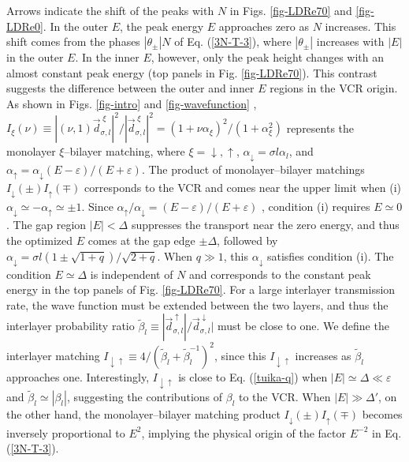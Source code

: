 \documentclass{jpsj3}
\begin{document}
Arrows indicate
the shift of the peaks with $N$
in Figs. \ref{fig-LDRe70}
and \ref{fig-LDRe0}.
In the outer $E$,
the peak energy $E$ approaches
zero as $N$ increases.
This shift comes from the phases $|\theta_\pm|N$ of Eq. (\ref{3N-T-3}),
where $|\theta_\pm|$ increases with $|E|$ in the outer $E$.
In the inner $E$, however, only the peak height changes
with an almost constant peak energy 
(top panels in Fig. \ref{fig-LDRe70}).
This contrast suggests
the difference between the outer and inner $E$ regions
in the VCR origin.
As shown in Figs. \ref{fig-intro} and \ref{fig-wavefunction} ,
$I_\xi(\nu) \equiv |(\nu,1) \vec{d}^{\;\xi}_{\sigma,l}|^2/|\vec{d}^{\;\xi}_{\sigma,l}|^2=(1+\nu\alpha_\xi)^2/(1+\alpha_\xi^2)$
represents the monolayer $\xi$--bilayer matching, where $\xi =\downarrow,\uparrow$, $\alpha_\downarrow =\sigma l \alpha_l$, and $\alpha_\uparrow= \alpha_\downarrow(E-\varepsilon)/(E+\varepsilon)$. 
The product of monolayer--bilayer matchings $I_\downarrow(\pm)I_\uparrow(\mp)$ corresponds to
the VCR and comes near the upper limit when (i) $\alpha_\downarrow \simeq -\alpha_\uparrow \simeq \pm 1$. Since 
$ \alpha_\uparrow/\alpha_\downarrow =(E-\varepsilon)/(E+\varepsilon)$
, condition (i) requires $E\simeq 0$.
The gap region $|E| < \Delta$ suppresses the transport near the zero energy, and thus
the optimized $E$ comes at the gap edge $\pm \Delta$, followed by $\alpha_\downarrow=\sigma l ( 1 \pm \sqrt{1+q})/\sqrt{2+q}$. 
When $q \gg 1$, this $\alpha_\downarrow$ satisfies condition (i). 
The condition $E \simeq \Delta$ is independent of $N$
and corresponds to the constant peak energy in the top panels of Fig. \ref{fig-LDRe70}.
For a large interlayer transmission rate,
the wave function must be extended between the two layers,
and thus the interlayer probability ratio
$\tilde{\beta}_l \equiv
|\vec{d}_{\sigma,l}^{\;\uparrow}|/
\vec{d}_{\sigma,l}^{\;\downarrow}| $
must be close to one.
We define the interlayer matching $I_{\downarrow\uparrow} \equiv 4/(\tilde{\beta}_l+\tilde{\beta}_l^{-1})^2$, 
since this $I_{\downarrow\uparrow}$ increases as $\tilde{\beta}_l$ approaches one.
Interestingly, 
$I_{\downarrow\uparrow}$ is close to Eq. (\ref{tuika-q}) when $|E|\simeq \Delta \ll \varepsilon$ and $\tilde{\beta}_l \simeq |\beta_l|$,
suggesting the contributions of $\beta_l$ to the VCR.
When $|E| \gg \Delta'$, on the other hand,
the monolayer--bilayer matching product $I_\downarrow(\pm) I_\uparrow(\mp) $ becomes inversely proportional to $E^2$, implying the physical origin of the factor $E^{-2}$ in Eq. (\ref{3N-T-3}).
\end{document}
